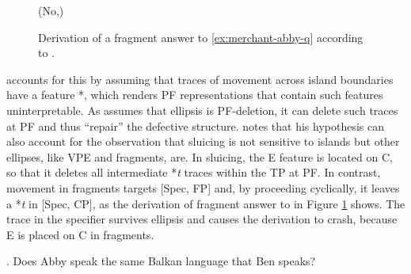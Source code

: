  \begin{figure}
(No,) 

\caption{Derivation of a fragment answer to \ref{ex:merchant-abby-q} according to \citet[708]{merchant2004}.\label{fig:merchant-abby-a}}
\end{figure}
%
\citet[706]{merchant2004} accounts for this by assuming that traces of movement across island boundaries have a feature *, which renders PF representations that contain such features uninterpretable. As \citeauthor{merchant2004} assumes that ellipsis is PF-deletion, it can delete such traces at PF and thus ``repair'' the defective structure. \citeauthor{merchant2004} notes that his hypothesis can also account for the observation that sluicing is not sensitive to islands but other ellipses, like VPE and fragments, are. In sluicing, the E feature is located on C, so that it deletes all intermediate *\textit{t} traces within the TP at PF. In contrast, movement in fragments targets [Spec, FP] and, by proceeding cyclically, it leaves a *\textit{t} in [Spec, CP], as the derivation of fragment answer to \Next in Figure \ref{fig:merchant-abby-a} shows. The trace in the specifier survives ellipsis and causes the derivation to crash, because E is placed on C in fragments. 

\ex. Does Abby speak the same Balkan language that Ben speaks?\label{ex:merchant-abby-q}

